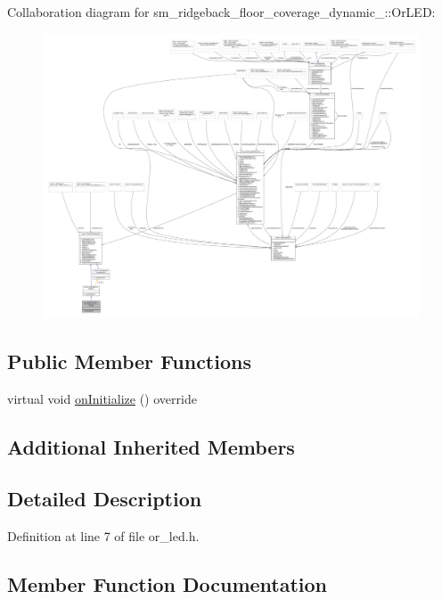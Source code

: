 Collaboration diagram for sm\+\_\+ridgeback\+\_\+floor\+\_\+coverage\+\_\+dynamic\+\_\+:\+:Or\+L\+ED\+:
\nopagebreak
\begin{figure}[H]
\begin{center}
\leavevmode
\includegraphics[width=350pt]{classsm__ridgeback__floor__coverage__dynamic__1_1_1OrLED__coll__graph}
\end{center}
\end{figure}
\subsection*{Public Member Functions}
\begin{DoxyCompactItemize}
\item 
virtual void \hyperlink{classsm__ridgeback__floor__coverage__dynamic__1_1_1OrLED_a4782b11d815df2f21e3e04213d03975a}{on\+Initialize} () override
\end{DoxyCompactItemize}
\subsection*{Additional Inherited Members}


\subsection{Detailed Description}


Definition at line 7 of file or\+\_\+led.\+h.



\subsection{Member Function Documentation}
\mbox{\label{classsm__ridgeback__floor__coverage__dynamic__1_1_1OrLED_a4782b11d815df2f21e3e04213d03975a}} 
